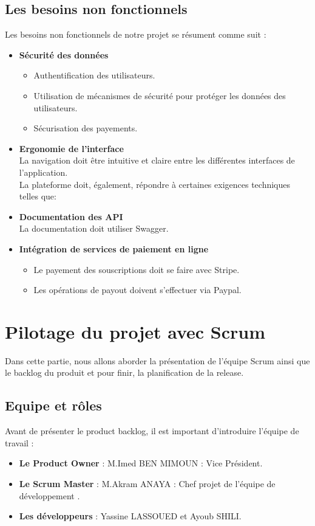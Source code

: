 \subsection{Les besoins non fonctionnels }
Les besoins non fonctionnels de notre projet se résument comme suit :
\begin{itemize}
    \item \textbf{Sécurité des données }
          \begin{itemize}
              \item Authentification des utilisateurs.
              \item Utilisation de mécanismes de sécurité pour protéger les données des utilisateurs.
              \item Sécurisation des payements.
          \end{itemize}
    \item \textbf{Ergonomie de l'interface }\\
          La navigation doit être intuitive et claire entre les différentes interfaces de l'application. \\
    
        La plateforme doit, également, répondre à certaines exigences techniques telles que: 
    \item \textbf{Documentation des API }\\
          La documentation doit utiliser Swagger.
    \item \textbf{Intégration de services de paiement en ligne }
          \begin{itemize}
            \item Le payement des souscriptions doit se faire avec Stripe.
            \item Les opérations de payout doivent s'effectuer via Paypal.
          \end{itemize}
\end{itemize}
\pagebreak


\section{Pilotage du projet avec Scrum }
Dans cette partie, nous allons aborder la présentation de l'équipe Scrum ainsi que le backlog du produit et pour finir, la planification de la release.
\subsection{Equipe et rôles  }
Avant de présenter le product backlog, il est important d'introduire l'équipe de travail :
\begin{itemize}
    \item \textbf{Le Product Owner }: M.Imed BEN MIMOUN : Vice Président.
    \item \textbf{Le Scrum Master }: M.Akram ANAYA : Chef projet de l’équipe de développement .
    \item \textbf{Les développeurs  }: Yassine LASSOUED et Ayoub SHILI.
\end{itemize}
